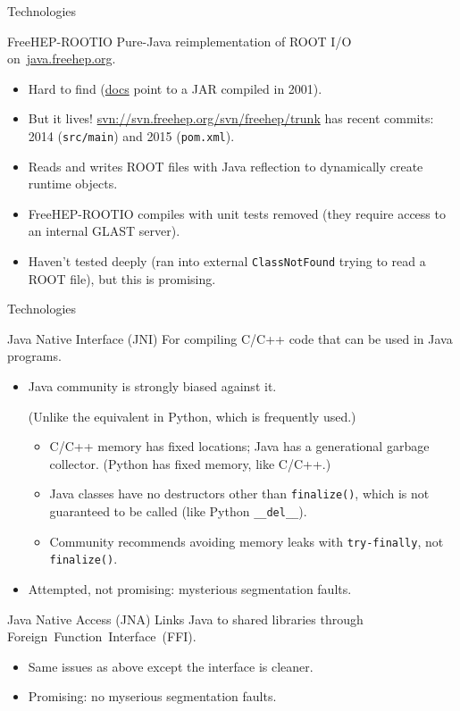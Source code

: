 \documentclass{beamer}
\begin{document}
\begin{frame}{Technologies}

\begin{block}{FreeHEP-ROOTIO}
Pure-Java reimplementation of ROOT I/O \mbox{on \url{java.freehep.org}.\hspace{-1 cm}}
\begin{itemize}
\item Hard to find (\href{http://java.freehep.org/freehep-rootio/}{docs} point to a JAR compiled in 2001).
\item But it lives! \url{svn://svn.freehep.org/svn/freehep/trunk} has recent commits: 2014 ({\tt src/main}) and 2015 ({\tt pom.xml}).
\item Reads and writes ROOT files with Java reflection to dynamically create runtime objects.
\item FreeHEP-ROOTIO compiles with unit tests removed (they require access to an internal GLAST server).
\item Haven't tested deeply (ran into external {\tt ClassNotFound} trying to read a ROOT file), but this is promising.
\end{itemize}
\end{block}
\end{frame}

\begin{frame}{Technologies}
\begin{block}{Java Native Interface (JNI)}
For compiling C/C++ code that can be used in Java programs.
\begin{itemize}
\item Java community is strongly biased against it.

(Unlike the equivalent in Python, which is frequently used.)
\begin{itemize}
\item C/C++ memory has fixed locations; Java has a generational garbage collector. (Python has fixed memory, like C/C++.)
\item Java classes have no destructors other than {\tt finalize()}, which is not guaranteed to be called (like Python {\tt \_\_del\_\_}).
\item Community recommends avoiding memory leaks with {\tt try-finally}, not {\tt finalize()}.
\end{itemize}
\item Attempted, not promising: mysterious segmentation faults.
\end{itemize}
\end{block}

\begin{block}{Java Native Access (JNA)}
Links Java to shared libraries through \mbox{Foreign Function Interface (FFI).\hspace{-1 cm}}
\begin{itemize}
\item Same issues as above except the interface is cleaner.
\item Promising: no myserious segmentation faults.
\end{itemize}
\end{block}
\end{frame}
\end{document}
